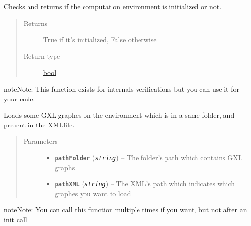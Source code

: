 \documentclass[letterpaper,10pt,english]{sphinxmanual}
\begin{document}

\begin{fulllineitems}
\label{doc:PythonGedLib.PyIsInitialized}
Checks and returns if the computation environment is initialized or not.
\begin{quote}\begin{description}
\item[{Returns}] \leavevmode
True if it's initialized, False otherwise

\item[{Return type}] \leavevmode
\href{https://docs.python.org/3/library/functions.html\#bool}{bool}

\end{description}\end{quote}

\begin{notice}{note}{Note:}
This function exists for internals verifications but you can use it for your code.
\end{notice}

\end{fulllineitems}


\begin{fulllineitems}
\label{doc:PythonGedLib.PyLoadGXLGraph}
Loads some GXL graphes on the environment which is in a same folder, and present in the XMLfile.
\begin{quote}\begin{description}
\item[{Parameters}] \leavevmode\begin{itemize}
\item {} 
\textbf{\texttt{pathFolder}} (\href{https://docs.python.org/3/library/string.html\#module-string}{\emph{\texttt{string}}}) -- The folder's path which contains GXL graphs

\item {} 
\textbf{\texttt{pathXML}} (\href{https://docs.python.org/3/library/string.html\#module-string}{\emph{\texttt{string}}}) -- The XML's path which indicates which graphes you want to load

\end{itemize}

\end{description}\end{quote}

\begin{notice}{note}{Note:}
You can call this function multiple times if you want, but not after an init call.
\end{notice}

\end{fulllineitems}
\end{document}
